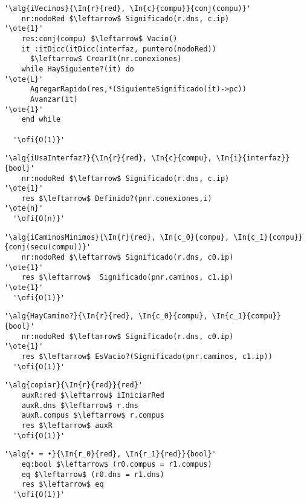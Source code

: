 \begin{lstlisting}[mathescape]
  '\alg{iVecinos}{\In{r}{red}, \In{c}{compu}}{conj(compu)}'
    nr:nodoRed $\leftarrow$ Significado(r.dns, c.ip)                     '\ote{1}'
    res:conj(compu) $\leftarrow$ Vacio()
    it :itDicc(itDicc(interfaz, puntero(nodoRed)) 
      $\leftarrow$ CrearIt(nr.conexiones)        
    while HaySiguiente?(it) do                                                     '\ote{L}'
      AgregarRapido(res,*(SiguienteSignificado(it)->pc))
      Avanzar(it)                                                                  '\ote{1}'
    end while

  '\ofi{O(1)}'
\end{lstlisting}

\begin{lstlisting}[mathescape]
  '\alg{iUsaInterfaz?}{\In{r}{red}, \In{c}{compu}, \In{i}{interfaz}}{bool}'
    nr:nodoRed $\leftarrow$ Significado(r.dns, c.ip)                     '\ote{1}'
    res $\leftarrow$ Definido?(pnr.conexiones,i)                      '\ote{n}'
  '\ofi{O(n)}'
\end{lstlisting}

\begin{lstlisting}[mathescape]
  '\alg{iCaminosMinimos}{\In{r}{red}, \In{c_0}{compu}, \In{c_1}{compu}}{conj(secu(compu))}'
    nr:nodoRed $\leftarrow$ Significado(r.dns, c0.ip)                    '\ote{1}'
    res $\leftarrow$  Significado(pnr.caminos, c1.ip)           '\ote{1}'
  '\ofi{O(1)}'
\end{lstlisting}

\begin{lstlisting}[mathescape]
  '\alg{HayCamino?}{\In{r}{red}, \In{c_0}{compu}, \In{c_1}{compu}}{bool}'
    nr:nodoRed $\leftarrow$ Significado(r.dns, c0.ip)                    '\ote{1}'
    res $\leftarrow$ EsVacio?(Significado(pnr.caminos, c1.ip))                                       
  '\ofi{O(1)}'
\end{lstlisting}

\begin{lstlisting}[mathescape]
  '\alg{copiar}{\In{r}{red}}{red}'
    auxR:red $\leftarrow$ iIniciarRed
    auxR.dns $\leftarrow$ r.dns
    auxR.compus $\leftarrow$ r.compus
    res $\leftarrow$ auxR                                
  '\ofi{O(1)}'
\end{lstlisting}

\begin{lstlisting}[mathescape]
  '\alg{• = •}{\In{r_0}{red}, \In{r_1}{red}}{bool}'
    eq:bool $\leftarrow$ (r0.compus = r1.compus)
    eq $\leftarrow$ (r0.dns = r1.dns)
    res $\leftarrow$ eq                               
  '\ofi{O(1)}'
\end{lstlisting}


 

